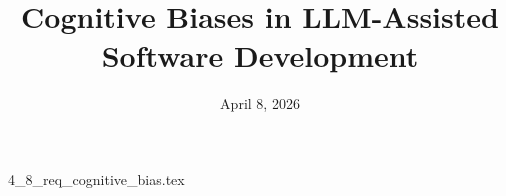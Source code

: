 \documentclass{article}      %
\title{Cognitive Biases in LLM-Assisted Software Development}  %
\date{April 8, 2026}
\begin{document}

\maketitle                   %



{4_8_req_cognitive_bias.tex}
\printbibliography
\end{document}

